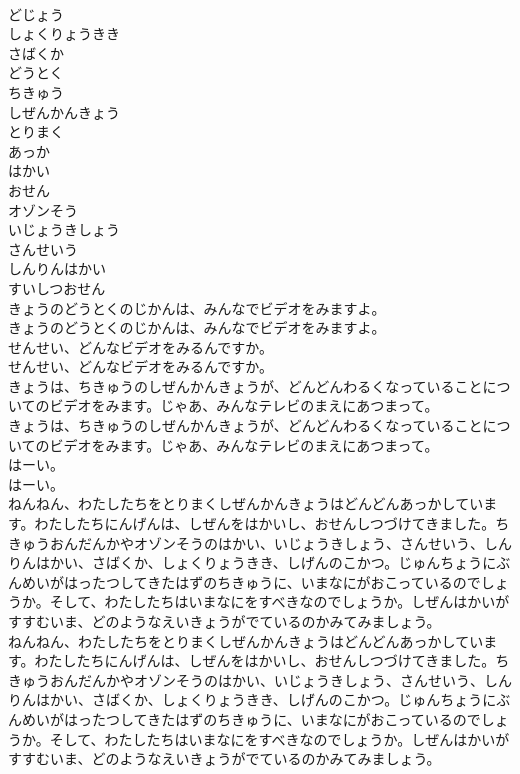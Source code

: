 \documentclass[8pt]{extreport}
\begin{document}
\begin{CJK}{UTF8}{min}
\\	どじょう
\\	しょくりょうきき
\\	さばくか
\\	どうとく
\\	ちきゅう
\\	しぜんかんきょう
\\	とりまく
\\	あっか
\\	はかい
\\	おせん
\\	オゾンそう
\\	いじょうきしょう
\\	さんせいう
\\	しんりんはかい
\\	すいしつおせん
\\	きょうのどうとくのじかんは、みんなでビデオをみますよ。
\\	きょうのどうとくのじかんは、みんなでビデオをみますよ。
\\	せんせい、どんなビデオをみるんですか。
\\	せんせい、どんなビデオをみるんですか。
\\	きょうは、ちきゅうのしぜんかんきょうが、どんどんわるくなっていることについてのビデオをみます。じゃあ、みんなテレビのまえにあつまって。
\\	きょうは、ちきゅうのしぜんかんきょうが、どんどんわるくなっていることについてのビデオをみます。じゃあ、みんなテレビのまえにあつまって。
\\	はーい。
\\	はーい。
\\	ねんねん、わたしたちをとりまくしぜんかんきょうはどんどんあっかしています。わたしたちにんげんは、しぜんをはかいし、おせんしつづけてきました。ちきゅうおんだんかやオゾンそうのはかい、いじょうきしょう、さんせいう、しんりんはかい、さばくか、しょくりょうきき、しげんのこかつ。じゅんちょうにぶんめいがはったつしてきたはずのちきゅうに、いまなにがおこっているのでしょうか。そして、わたしたちはいまなにをすべきなのでしょうか。しぜんはかいがすすむいま、どのようなえいきょうがでているのかみてみましょう。
\\	ねんねん、わたしたちをとりまくしぜんかんきょうはどんどんあっかしています。わたしたちにんげんは、しぜんをはかいし、おせんしつづけてきました。ちきゅうおんだんかやオゾンそうのはかい、いじょうきしょう、さんせいう、しんりんはかい、さばくか、しょくりょうきき、しげんのこかつ。じゅんちょうにぶんめいがはったつしてきたはずのちきゅうに、いまなにがおこっているのでしょうか。そして、わたしたちはいまなにをすべきなのでしょうか。しぜんはかいがすすむいま、どのようなえいきょうがでているのかみてみましょう。

\end{CJK}
\end{document}
